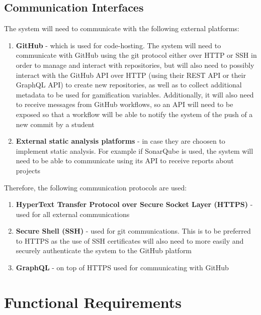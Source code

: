 \subsection{Communication Interfaces}
The system will need to communicate with the following external platforms:
\begin{enumerate}
      \item \textbf{GitHub} {-} which is used for code-hosting. The system will need to
            communicate with GitHub using the git protocol either over HTTP or SSH in order
            to manage and interact with repositories, but will also need to possibly interact
            with the GitHub API over HTTP (using their REST API or their GraphQL API) to
            create new repositories, as well as to collect additional metadata to be used
            for gamification variables. Additionally, it will also need to receive messages
            from GitHub workflows, so an API will need to be exposed so that a workflow
            will be able to notify the system of the push of a new commit by a student
      \item \textbf{External static analysis platforms} {-} in case they are choosen to
            implement static analysis. For example if SonarQube is used, the system will
            need to be able to communicate using its API to receive reports about projects
\end{enumerate}

Therefore, the following communication protocols are used:
\begin{enumerate}
      \item \textbf{HyperText Transfer Protocol over Secure Socket Layer (HTTPS)} {-} used
            for all external communications
      \item \textbf{Secure Shell (SSH)} {-} used for git communications. This is to be
            preferred to HTTPS as the use of SSH certificates will also need to more easily
            and securely authenticate the system to the GitHub platform
      \item \textbf{GraphQL} {-} on top of HTTPS used for communicating with GitHub
\end{enumerate}

\section{Functional Requirements}

